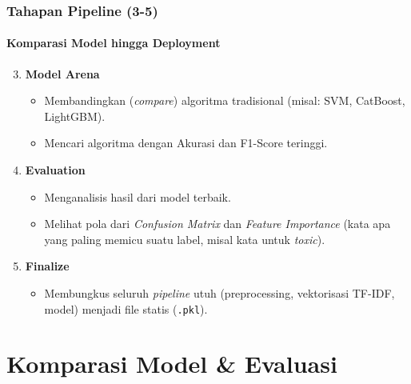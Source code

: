 \documentclass[t,aspectratio=169,xcolor=dvipsnames]{beamer}
\begin{document}
\begin{frame}
    \frametitle{Tahapan Pipeline (3-5)}
    \framesubtitle{Komparasi Model hingga Deployment}
    \small
    \begin{enumerate}
        \setcounter{enumi}{2}
        \item \textbf{Model Arena}
        \begin{itemize}
            \item Membandingkan (\textit{compare}) algoritma tradisional (misal: SVM, CatBoost, LightGBM).
            \item Mencari algoritma dengan Akurasi dan F1-Score teringgi.
        \end{itemize}
        \vspace{0.1cm}
        \item \textbf{Evaluation}
        \begin{itemize}
            \item Menganalisis hasil dari model terbaik.
            \item Melihat pola dari \textit{Confusion Matrix} dan \textit{Feature Importance} (kata apa yang paling memicu suatu label, misal kata untuk \textit{toxic}).
        \end{itemize}
        \vspace{0.1cm}
        \item \textbf{Finalize}
        \begin{itemize}
            \item Membungkus seluruh \textit{pipeline} utuh (preprocessing, vektorisasi TF-IDF, model) menjadi file statis (\texttt{.pkl}).
        \end{itemize}
    \end{enumerate}
\end{frame}

\section{Komparasi Model \& Evaluasi}
\end{document}
